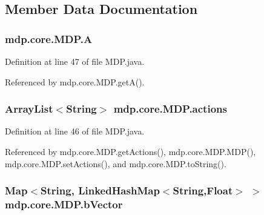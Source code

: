 \subsection{Member Data Documentation}
\hypertarget{classmdp_1_1core_1_1_m_d_p_ac75a611d9f5186893b70b8072bfa0804}{}
\subsubsection[{A}]{ mdp.\+core.\+M\+D\+P.\+A\hspace{0.3cm}{\ttfamily [private]}}\label{classmdp_1_1core_1_1_m_d_p_ac75a611d9f5186893b70b8072bfa0804}


Definition at line 47 of file M\+D\+P.\+java.



Referenced by mdp.\+core.\+M\+D\+P.\+get\+A().

\hypertarget{classmdp_1_1core_1_1_m_d_p_a9da06680f73a486a6ee65c8208151e70}{}
\subsubsection[{actions}]{\setlength{\rightskip}{0pt plus 5cm}Array\+List$<$String$>$ mdp.\+core.\+M\+D\+P.\+actions\hspace{0.3cm}{\ttfamily [private]}}\label{classmdp_1_1core_1_1_m_d_p_a9da06680f73a486a6ee65c8208151e70}


Definition at line 46 of file M\+D\+P.\+java.



Referenced by mdp.\+core.\+M\+D\+P.\+get\+Actions(), mdp.\+core.\+M\+D\+P.\+M\+D\+P(), mdp.\+core.\+M\+D\+P.\+set\+Actions(), and mdp.\+core.\+M\+D\+P.\+to\+String().

\hypertarget{classmdp_1_1core_1_1_m_d_p_a16eff8bad86554cc9f97f674b1625c66}{}
\subsubsection[{b\+Vector}]{\setlength{\rightskip}{0pt plus 5cm}Map$<$String, Linked\+Hash\+Map$<$String,Float$>$ $>$ mdp.\+core.\+M\+D\+P.\+b\+Vector\hspace{0.3cm}{\ttfamily [private]}}\label{classmdp_1_1core_1_1_m_d_p_a16eff8bad86554cc9f97f674b1625c66}


